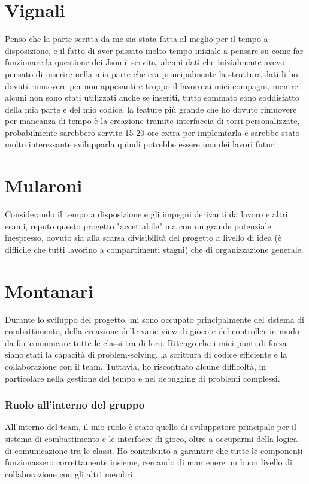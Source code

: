 \documentclass[a4paper,12pt]{report}
\begin{document}
\section{Vignali}
Penso che la parte scritta da me sia stata fatta al meglio per il tempo a disposizione, e il fatto di aver passato molto tempo iniziale a 
%
pensare su come far funzionare la questione dei Json è servita, alcuni dati che inizialmente avevo pensato di inserire nella mia parte che era principalmente la struttura dati li ho dovuti
%
rimuovere per non appesantire troppo il lavoro ai miei compagni, mentre alcuni non sono stati utilizzati anche se inseriti,
%
tutto sommato sono soddisfatto della mia parte e del mio codice, la feature più grande che ho dovuto rimuovere per mancanza di tempo è
%
la creazione tramite interfaccia di torri personalizzate, probabilmente sarebbero servite 15-20 ore extra per implemtarla e sarebbe stato molto interessante svilupparla quindi potrebbe essere una dei lavori futuri
\section{Mularoni}
Considerando il tempo a disposizione e gli impegni derivanti da lavoro e altri esami, reputo questo progetto "accettabile" ma con un grande potenziale inespresso,
%
dovuto sia alla scarsa divisibilità del progetto a livello di idea (è difficile che tutti lavorino a compartimenti stagni) che di organizzazione generale.
\section{Montanari}
Durante lo sviluppo del progetto, mi sono occupato principalmente del sistema di combattimento, della creazione delle varie view di gioco e del controller in modo da far comunicare tutte le classi tra di loro. Ritengo che i miei punti di forza siano stati la capacità di problem-solving, la scrittura di codice efficiente e la collaborazione con il team. Tuttavia, ho riscontrato alcune difficoltà, in particolare nella gestione del tempo e nel debugging di problemi complessi.

\subsubsection{Ruolo all'interno del gruppo}
All'interno del team, il mio ruolo è stato quello di sviluppatore principale per il sistema di combattimento e le interfacce di gioco, oltre a occuparmi della logica di comunicazione tra le classi. Ho contribuito a garantire che tutte le componenti funzionassero correttamente insieme, cercando di mantenere un buon livello di collaborazione con gli altri membri.
\end{document}
